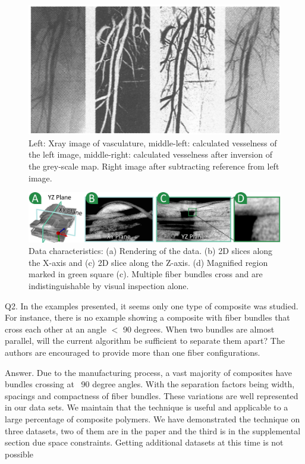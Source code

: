 \documentclass[]{article}
\begin{document}
\begin{figure}
\centering
\includegraphics[width=0.7\linewidth]{images_pvis/Vesselness}
\caption{Left: Xray image of vasculature, middle-left: calculated vesselness of the left image, middle-right: calculated vesselness after inversion of the grey-scale map. Right image after subtracting reference from left image.}
\label{fig:Vesselness}
\end{figure}

\begin{figure}[tb]
	\centering
	\includegraphics[width=\linewidth]{images_pvis/data-char.pdf}
	\caption{Data characteristics: (a) Rendering of the data. (b) 2D slices along the X-axis and (c) 2D slice along the Z-axis. (d) Magnified region marked in green square (c). Multiple fiber bundles cross and are indistinguishable by visual inspection alone. }
	\label{fig:data-char-rebuttal}
\end{figure}

\color{red}
Q2. In the examples presented, it seems only one type of composite was studied. For instance, there is no example showing a composite with fiber bundles that cross each other at an angle $<$ 90 degrees. When two bundles are almost parallel, will the current algorithm be sufficient to separate them apart? The authors are encouraged to provide more than one fiber configurations.
\color{black}

Answer. Due to the manufacturing process, a vast majority of composites have bundles crossing at ~90 degree angles. With the separation factors being width, spacings and compactness of fiber bundles. These variations are well represented in our data sets. We maintain that the technique is useful and applicable to a large percentage of composite polymers. We have demonstrated the technique on three datasets, two of them are in the paper and the third is in the supplemental section due space  constraints. Getting additional datasets at this time is not possible
\end{document}
